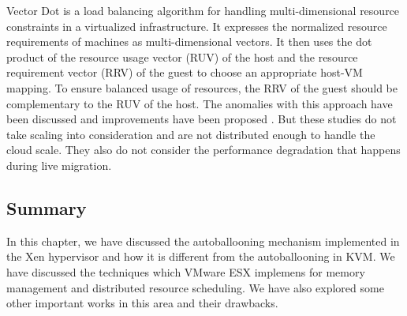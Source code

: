 Vector Dot \cite{singh2008server} is a load balancing algorithm for handling multi-dimensional resource constraints in a virtualized infrastructure. It expresses the normalized resource requirements of machines as multi-dimensional vectors. It then uses the dot product of the resource usage vector (RUV) of the host and the resource requirement vector (RRV) of the guest to choose an appropriate host-VM mapping. To ensure balanced usage of resources, the RRV of the guest should be complementary to the RUV of the host. The anomalies with this approach have been discussed and improvements have been proposed \cite{mishra2011theory}. But these studies do not take scaling into consideration and are not distributed enough to handle the cloud scale. They also do not consider the performance degradation that happens during live migration.

\subsection*{Summary}
In this chapter, we have discussed the autoballooning mechanism implemented in the Xen hypervisor and how it is different from the autoballooning in KVM. We have discussed the techniques which VMware ESX implemens for memory management and distributed resource scheduling. We have also explored some other important works in this area and their drawbacks.